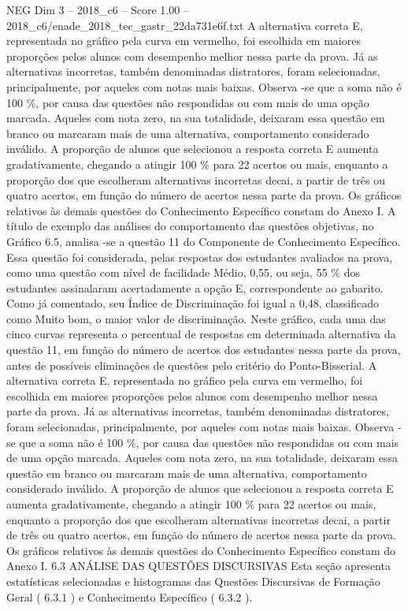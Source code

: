 \begin{textsample}{NEG Dim 3 – 2018\_c6 – Score 1.00 – 2018\_c6/enade\_2018\_tec\_gastr\_22da731e6f.txt}
A alternativa correta E, representada no gráfico pela curva em vermelho, foi escolhida em maiores proporções pelos alunos com desempenho melhor nessa parte da prova.
Já as alternativas incorretas, também denominadas distratores, foram selecionadas, principalmente, por aqueles com notas mais baixas.
Observa -se que a soma não é 100 \%, por causa das questões não respondidas ou com mais de uma opção marcada.
Aqueles com nota zero, na sua totalidade, deixaram essa questão em branco ou marcaram mais de uma alternativa, comportamento considerado inválido.
A proporção de alunos que selecionou a resposta correta E aumenta gradativamente, chegando a atingir 100 \% para 22 acertos ou mais, enquanto a proporção dos que escolheram alternativas incorretas decai, a partir de três ou quatro acertos, em função do número de acertos nessa parte da prova.
Os gráficos relativos às demais questões do Conhecimento Específico constam do Anexo I.
A título de exemplo das análises do comportamento das questões objetivas, no Gráfico 6.5, analisa -se a questão 11 do Componente de Conhecimento Específico.
Essa questão foi considerada, pelas respostas dos estudantes avaliados na prova, como uma questão com nível de facilidade Médio, 0,55, ou seja, 55 \% dos estudantes assinalaram acertadamente a opção E, correspondente ao gabarito.
Como já comentado, seu Índice de Discriminação foi igual a 0,48, classificado como Muito bom, o maior valor de discriminação.
Neste gráfico, cada uma das cinco curvas representa o percentual de respostas em determinada alternativa da questão 11, em função do número de acertos dos estudantes nessa parte da prova, antes de possíveis eliminações de questões pelo critério do Ponto-Bisserial.
A alternativa correta E, representada no gráfico pela curva em vermelho, foi escolhida em maiores proporções pelos alunos com desempenho melhor nessa parte da prova.
Já as alternativas incorretas, também denominadas distratores, foram selecionadas, principalmente, por aqueles com notas mais baixas.
Observa -se que a soma não é 100 \%, por causa das questões não respondidas ou com mais de uma opção marcada.
Aqueles com nota zero, na sua totalidade, deixaram essa questão em branco ou marcaram mais de uma alternativa, comportamento considerado inválido.
A proporção de alunos que selecionou a resposta correta E aumenta gradativamente, chegando a atingir 100 \% para 22 acertos ou mais, enquanto a proporção dos que escolheram alternativas incorretas decai, a partir de três ou quatro acertos, em função do número de acertos nessa parte da prova.
Os gráficos relativos às demais questões do Conhecimento Específico constam do Anexo I. 6.3 ANÁLISE DAS QUESTÕES DISCURSIVAS Esta seção apresenta estatísticas selecionadas e histogramas das Questões Discursivas de Formação Geral ( 6.3.1 ) e Conhecimento Específico ( 6.3.2 ).

\end{textsample}
